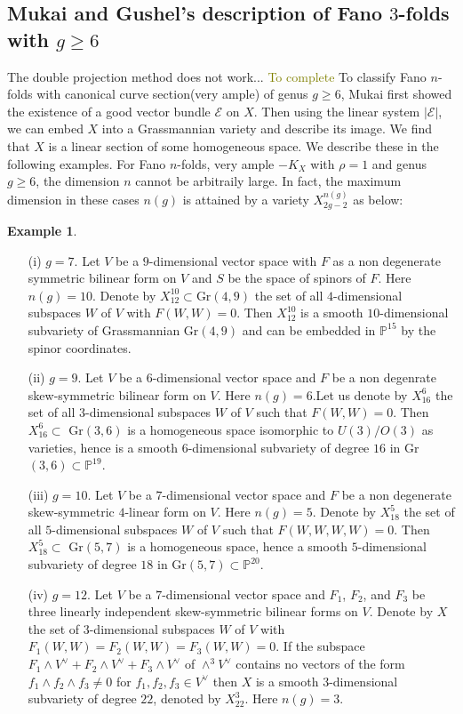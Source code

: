 \documentclass[11pt]{amsart}
\theoremstyle{plain}
\theoremstyle{definition}
\newtheorem{example}[theorem]{Example}
\theoremstyle{expl}
\begin{document}
\subsection{Mukai and Gushel's description of Fano $3$-folds with $g\geq 6$}
The double projection method does not work...  \textcolor{olive}{To complete}
To classify Fano $n$-folds with canonical curve section(very ample) of genus $g \geq 6$, Mukai first showed the existence of a good vector bundle $\mathcal{E}$ on $X$. Then using the linear system $|\mathcal{E}|$, we can embed $X$ into a Grassmannian variety and describe its image. We find that $X$ is a linear section of some homogeneous space. We describe these in the following examples.
For Fano $n$-folds, very ample $-K_X$ with $\rho=1$ and genus $g\geq 6$, the dimension $n$ cannot be arbitraily large. In fact, the maximum dimension in these cases $n(g)$ is attained by a variety $X_{2g-2}^{n(g)}$ as below:
\begin{example}
\begin{enumerate}
\item[(i)] $g=7$. Let $V$ be a $9$-dimensional vector space with $F$ as a non degenerate symmetric bilinear form on $V$ and $S$ be the space of spinors of $F$. Here $n(g)=10$. Denote by $X_{12}^{10} \subset $Gr$(4,9)$ the set of all $4$-dimensional subspaces $W$ of $V$ with $F(W,W)=0$. Then $X_{12}^{10}$ is a smooth $10$-dimensional subvariety of Grassmannian Gr$(4,9)$ and can be embedded in $\mathbb{P}^{15}$ by the spinor coordinates. 
            \item[(ii)] $g=9$. Let $V$ be a $6$-dimensional vector space and $F$ be a non degenrate skew-symmetric bilinear form on $V$. Here $n(g)=6$.Let us denote by $X_{16}^6$ the set of all $3$-dimensional subspaces $W$ of $V$ such that $F(W,W)=0$. Then $X_{16}^6 \subset $ Gr$(3,6)$ is a homogeneous space isomorphic to $U(3)/O(3)$ as varieties, hence is a smooth $6$-dimensional subvariety of degree $16$ in Gr$(3,6)\subset  \mathbb{P}^{19}$.
            \item[(iii)] $g=10$. Let $V$ be a $7$-dimensional vector space and $F$ be a non degenerate skew-symmetric $4$-linear form on $V$. Here $n(g)=5$. Denote by $X_{18}^5$ the set of all $5$-dimensional subspaces $W$ of $V$ such that $F(W,W,W,W)=0$. Then $X_{18}^5 \subset $ Gr$(5,7)$ is a homogeneous space, hence a smooth $5$-dimensional subvariety of degree $18$ in Gr$(5,7) \subset \mathbb{P}^{20}$. 
            
            \item[(iv)] $g=12$. Let $V$ be a $7$-dimensional vector space and $F_1$, $F_2$, and $F_3$ be three linearly independent skew-symmetric bilinear forms on $V$. Denote by $X$ the set of $3$-dimensional subspaces $W$ of $V$ with $F_1(W,W)=F_2(W,W)=F_3(W,W)=0$. If the subspace $F_1 \wedge V^{\vee} + F_2 \wedge V^{\vee} + F_3 \wedge V^{\vee}$ of $\wedge^3 V^{\vee}$ contains no vectors of the form $f_1 \wedge f_2 \wedge f_3 \neq 0$ for $f_1, f_2, f_3 \in V^{\vee}$ then $X$ is a smooth $3$-dimensional subvariety of degree $22$, denoted by $X_{22}^3$. Here $n(g)= 3$.
        \end{enumerate}
\end{example}
\end{document}

